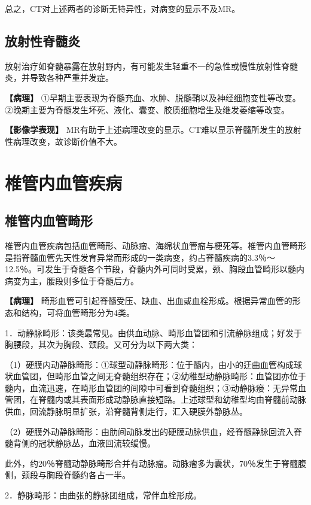 总之，CT对上述两者的诊断无特异性，对病变的显示不及MR。

\subsection{放射性脊髓炎}

放射治疗如脊髓暴露在放射野内，有可能发生轻重不一的急性或慢性放射性脊髓炎，并导致各种严重并发症。

\textbf{【病理】}
①早期主要表现为脊髓充血、水肿、脱髓鞘以及神经细胞变性等改变。②晚期主要为脊髓发生坏死、液化、囊变、胶质细胞增生及继发萎缩等改变。

\textbf{【影像学表现】}
MR有助于上述病理改变的显示。CT难以显示脊髓所发生的放射性病理改变，故诊断价值不大。

\section{椎管内血管疾病}

\subsection{椎管内血管畸形}

椎管内血管疾病包括血管畸形、动脉瘤、海绵状血管瘤与梗死等。椎管内血管畸形是指脊髓血管先天性发育异常而形成的一类病变，约占脊髓疾病的3.3％～12.5％。可发生于脊髓各个节段，脊髓内外可同时受累，颈、胸段血管畸形以髓内病变为主，腰段则多位于脊髓后方。

\textbf{【病理】}
畸形血管可引起脊髓受压、缺血、出血或血栓形成。根据异常血管的形态和结构，可将血管畸形分为4类。

1．动静脉畸形：该类最常见。由供血动脉、畸形血管团和引流静脉组成；好发于胸腰段，其次为胸段、颈段。又可分为以下两大类：

（1）硬膜内动静脉畸形：①球型动静脉畸形：位于髓内，由小的迂曲血管构成球状血管团，但畸形血管之间无脊髓组织存在；②幼稚型动静脉畸形：血管团亦位于髓内，血流迅速，在畸形血管团的间隙中可看到脊髓组织；③动静脉瘘：无异常血管团，在脊髓内或其表面形成动静脉直接短路。上述球型和幼稚型均由脊髓前动脉供血，回流静脉明显扩张，沿脊髓背侧走行，汇入硬膜外静脉丛。

（2）硬膜外动静脉畸形：由肋间动脉发出的硬膜动脉供血，经脊髓静脉回流入脊髓背侧的冠状静脉丛，血液回流较缓慢。

此外，约20％脊髓动静脉畸形合并有动脉瘤。动脉瘤多为囊状，70％发生于脊髓腹侧，颈段与胸段脊髓约各占一半。

2．静脉畸形：由曲张的静脉团组成，常伴血栓形成。

